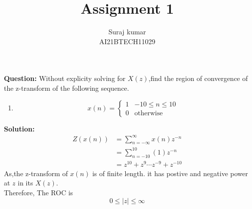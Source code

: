 \documentclass[10pt,twocolumn]{IEEEtran}
\title{Assignment 1}
\author{Suraj kumar \\ \normalsize AI21BTECH11029}
\newcommand{\question}{\noindent \textbf{Question: }}
\newcommand{\solution}{\noindent \textbf{Solution: }}
\begin{document}
\maketitle
\question Without explicity solving for $X(z)$,find the region of convergence of the z-transform of the following sequence.
\begin{enumerate}[label=(\roman*)]
    \item $$
    x(n)=
    \begin{cases}
    1  &-10\leq n\leq 10\\
   0  &\text{otherwise}
    \end{cases}
    $$
\end{enumerate}
\solution 
\begin{align}
    Z(x(n))&=\sum_{n=-\infty}^{\infty} x(n) z^{-n}\\
    &=\sum_{n=-10}^{10}(1)z^{-n}\\
    &=z^{10}+z^{9} \cdots  z^{-9}+z^{-10}
\end{align}
As,the z-transform of $x(n)$ is of finite length.
it has postive and negative power at $z$ in its $X(z)$.\\
Therefore, The ROC is\\
$$0\leq \lvert z \rvert \leq \infty$$
\end{document}
